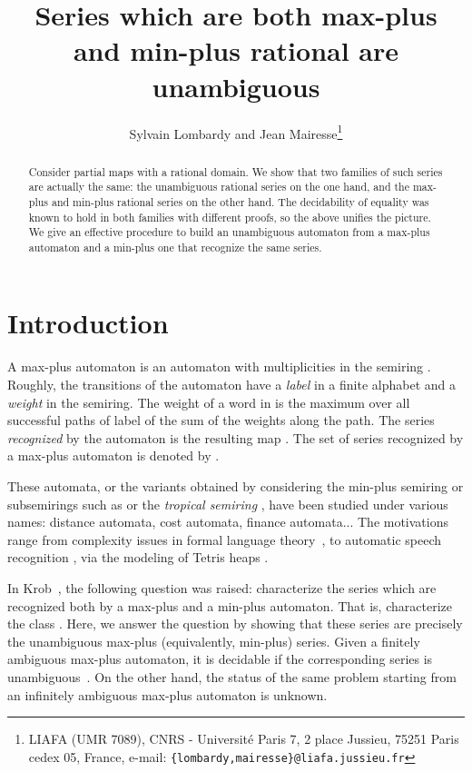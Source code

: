 \documentclass{article}
\newcommand{\1}{\mathbb{1}}
\newcommand{\0}{\mathbb{0}}
\begin{document}
\title{Series which are both max-plus and min-plus rational are
  unambiguous}
\author{Sylvain Lombardy and Jean Mairesse\thanks{LIAFA (UMR 7089), CNRS - Universit\'e Paris 7,
2 place Jussieu, 75251 Paris cedex 05, France,
e-mail: {\small{\tt \{lombardy,mairesse\}@liafa.jussieu.fr}}}}

\maketitle

\begin{abstract}
Consider partial maps  with a rational
domain. We show that two families of such series are actually the
same: the unambiguous rational series on the one hand, and 
the max-plus and min-plus rational series on the other hand.
The decidability of equality was known to hold in both families with
different proofs, so the above unifies the picture. 
We give an effective procedure to build an unambiguous automaton from
a max-plus automaton and a min-plus one that recognize the same series.
\end{abstract}

\section{Introduction}

A max-plus automaton is an automaton with multiplicities in the
semiring . Roughly, the transitions
of the automaton have a {\em label} in a finite alphabet  and a {\em
  weight} in the semiring. The weight of a word  in  is the maximum over all
successful paths of label  of the sum of the weights along the path. 
The series {\em recognized} by the
automaton  is the resulting map . The set of series recognized by a max-plus automaton 
is denoted by . 

These automata, or the variants obtained by considering the min-plus
semi\-ring  or subsemirings such as 
 or the {\em tropical semiring} , have been studied
under various names: distance automata, cost automata, finance
automata... 
The motivations range from complexity issues in formal language
theory~\cite{simo88}, 
to automatic speech recognition \cite{mohr}, via the modeling of Tetris
heaps \cite{GaMa98b}. 

In Krob~\cite{krob94}, the following question was raised: characterize the
series which are recognized both by a max-plus and a min-plus
automaton. That is, characterize the class . Here, we answer the question by showing that these
series are precisely the unambiguous max-plus (equivalently, min-plus)
series. Given a finitely ambiguous max-plus automaton, it is decidable if the
corresponding series is unambiguous~\cite{KLMP04}. On the other hand,
the status of the same problem
starting from an infinitely ambiguous max-plus automaton is unknown. 
\end{document}
